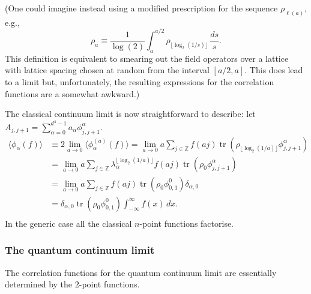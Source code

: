 \documentclass[prl,twocolumn,lengthcheck,superscriptaddress]{revtex4-1}
\newcommand{\tr}{\operatorname{tr}}
\theoremstyle{definition}
\theoremstyle{remark}
\begin{document}
(One could imagine instead using a modified prescription for the sequence $\rho_{\ell(a)}$, e.g.,
\begin{equation}
	\rho_{a} \equiv \frac{1}{\log(2)}\int_{a}^{a/2} \rho_{\lfloor \log_2(1/s)\rfloor}\, \frac{ds}{s}.
\end{equation}
This definition is equivalent to smearing out the field operators over a lattice with lattice spacing chosen at random from the interval $[a/2, a]$. This does lead to a limit but, unfortunately, the resulting expressions for the correlation functions are a somewhat awkward.)

The classical continuum limit is now straightforward to describe: let $A_{j,j+1} = \sum_{\alpha=0}^{d^4-1} a_\alpha \phi^\alpha_{j,j+1}.$
\begin{equation}
	\begin{split}
	\langle \phi_\alpha(f) \rangle  &\equiv 2\lim_{a\rightarrow 0}\langle\phi_{\alpha}^{(a)}(f) \rangle =  \lim_{a\rightarrow 0} a\sum_{j\in\mathbb{Z}} f(aj) \tr(\rho_{\lfloor \log_2(1/a)\rfloor}\phi_{j,j+1}^\alpha) \\
	&= \lim_{a\rightarrow 0} a\sum_{j\in\mathbb{Z}} \lambda_\alpha^{\lfloor \log_2(1/a)\rfloor}f(aj) \tr(\rho_0\phi_{j,j+1}^\alpha)  \\
	&= \lim_{a\rightarrow 0}  a\sum_{j\in\mathbb{Z}}f(aj)  \tr(\rho_0\phi_{0,1}^0) \delta_{\alpha,0}\\
	&= \delta_{\alpha,0}\tr(\rho_0\phi_{0,1}^0) \int_{-\infty}^{\infty} f(x)\,dx.  \\
	\end{split}
\end{equation}
In the generic case all the classical $n$-point functions factorise.

\subsubsection{The quantum continuum limit}
The correlation functions for the quantum continuum limit are essentially determined by the $2$-point functions. 
\end{document}
